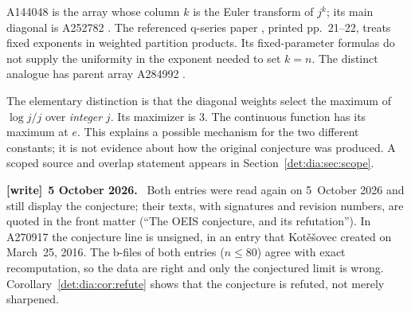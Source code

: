 \documentclass[11pt,letterpaper]{article}
\numberwithin{equation}{section}
\theoremstyle{definition}\newtheorem{definition}[theorem]{Definition}
\theoremstyle{remark}\newtheorem{remark}[theorem]{Remark}
\newenvironment{writenote}[1][]{\par\smallskip\begingroup\small
 \noindent\textbf{[write]}\if\relax\detokenize{#1}\relax\else~\textbf{#1.}\fi\ }%
 {\par\endgroup\smallskip}
\begin{document}
A144048 is the array whose column $k$ is the Euler transform of $j^k$;
its main diagonal is A252782 \cite{array}. The referenced q-series paper
\cite{kotesovec}, printed pp.~21--22, treats fixed exponents in weighted
partition products. Its fixed-parameter formulas do not supply the
uniformity in the exponent needed to set $k=n$. The distinct analogue has
parent array A284992 \cite{distinctarray}.

The elementary distinction is that the diagonal weights select the
maximum of $\log j/j$ over \emph{integer} $j$. Its maximizer is $3$.
The continuous function has its maximum at $e$. This explains a possible
mechanism for the two different constants; it is not evidence about how
the original conjecture was produced. A scoped source and overlap
statement appears in Section~\ref{det:dia:sec:scope}.
\begin{writenote}[5 October 2026]
Both entries were read again on 5~October 2026 and still display the conjecture; their texts, with signatures and revision numbers, are quoted in the front matter (``The OEIS conjecture, and its refutation''). In A270917 the conjecture line is unsigned, in an entry that Kot\v{e}\v{s}ovec created on March~25, 2016. The b-files of both entries ($n\le80$) agree with exact recomputation, so the data are right and only the conjectured limit is wrong. Corollary~\ref{det:dia:cor:refute} shows that the conjecture is refuted, not merely sharpened.
\end{writenote}
\end{document}
